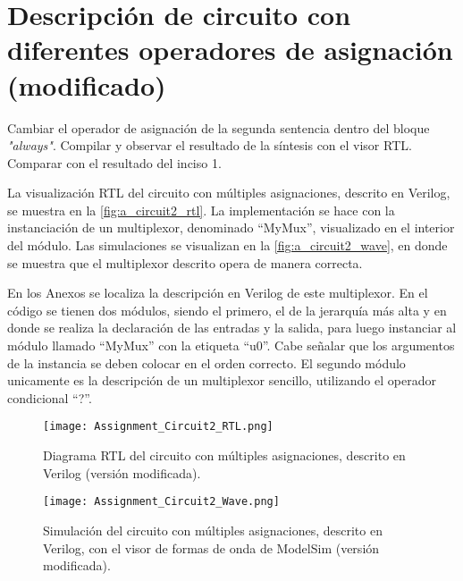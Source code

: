 \section{Descripción de circuito con diferentes operadores de asignación (modificado) \label{sec:s2}}

\begin{center}
	\begin{minipage}{12cm}
		\begin{tcolorbox}[title=Actividad 2]
			Cambiar el operador de asignación de la segunda sentencia dentro del bloque \textit{"always"}. Compilar y observar el resultado de la síntesis con el visor RTL. Comparar con el resultado del inciso 1.
		\end{tcolorbox}	
	\end{minipage}
\end{center}

La visualización RTL del circuito con múltiples asignaciones, descrito en Verilog, se muestra en la \autoref{fig:a_circuit2_rtl}. La implementación se hace con la instanciación de un multiplexor, denominado ``MyMux'', visualizado en el interior del módulo. Las simulaciones se visualizan en la \autoref{fig:a_circuit2_wave}, en donde se muestra que el multiplexor descrito opera de manera correcta.

En los Anexos se localiza la descripción en Verilog de este multiplexor. En el código se tienen dos módulos, siendo el primero, el de la jerarquía más alta y en donde se realiza la declaración de las entradas y la salida, para luego instanciar al módulo llamado ``MyMux'' con la etiqueta ``u0''. Cabe señalar que los argumentos de la instancia se deben colocar en el orden correcto. El segundo módulo unicamente es la descripción de un multiplexor sencillo, utilizando el operador condicional ``?''.

\begin{figure}[ht]
	\centering
	\texttt{[image: Assignment\_Circuit2\_RTL.png]}
	\caption{Diagrama RTL del circuito con múltiples asignaciones, descrito en Verilog (versión modificada). \label{fig:a_circuit2_rtl}}
\end{figure}

\begin{figure}[ht]
	\centering
	\texttt{[image: Assignment\_Circuit2\_Wave.png]}
	\caption{Simulación del circuito con múltiples asignaciones, descrito en Verilog, con el visor de formas de onda de ModelSim (versión modificada). \label{fig:a_circuit2_wave}}
\end{figure}